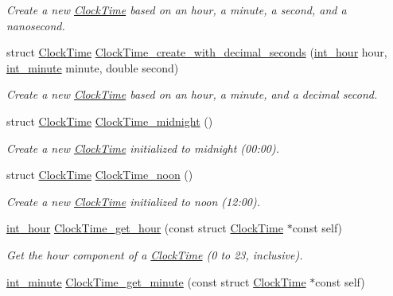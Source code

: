 \begin{DoxyCompactItemize}
\begin{DoxyCompactList}\small\item\em \-Create a new \hyperlink{structClockTime}{\-Clock\-Time} based on an hour, a minute, a second, and a nanosecond. \end{DoxyCompactList}\item 
struct \hyperlink{structClockTime}{\-Clock\-Time} \hyperlink{clock-time_8h_a519b7c6074cf1addc815f7495048c30b}{\-Clock\-Time\-\_\-create\-\_\-with\-\_\-decimal\-\_\-seconds} (\hyperlink{types_8h_afc81a27a9c08f0790f17b34bdf95cdb7}{int\-\_\-hour} hour, \hyperlink{types_8h_ae648329a919e6d860ef5ef2aac4ffb86}{int\-\_\-minute} minute, double second)
\begin{DoxyCompactList}\small\item\em \-Create a new \hyperlink{structClockTime}{\-Clock\-Time} based on an hour, a minute, and a decimal second. \end{DoxyCompactList}\item 
struct \hyperlink{structClockTime}{\-Clock\-Time} \hyperlink{clock-time_8h_ae320c2e30dedf0b33d5306b9e8841261}{\-Clock\-Time\-\_\-midnight} ()
\begin{DoxyCompactList}\small\item\em \-Create a new \hyperlink{structClockTime}{\-Clock\-Time} initialized to midnight (00\-:00). \end{DoxyCompactList}\item 
struct \hyperlink{structClockTime}{\-Clock\-Time} \hyperlink{clock-time_8h_a183049a7386a7b7377ba3059d15485c4}{\-Clock\-Time\-\_\-noon} ()
\begin{DoxyCompactList}\small\item\em \-Create a new \hyperlink{structClockTime}{\-Clock\-Time} initialized to noon (12\-:00). \end{DoxyCompactList}\item 
\hyperlink{types_8h_afc81a27a9c08f0790f17b34bdf95cdb7}{int\-\_\-hour} \hyperlink{clock-time_8h_a1688a98fb161dc7a743085b09cb3c1de}{\-Clock\-Time\-\_\-get\-\_\-hour} (const struct \hyperlink{structClockTime}{\-Clock\-Time} $\ast$const self)
\begin{DoxyCompactList}\small\item\em \-Get the hour component of a \hyperlink{structClockTime}{\-Clock\-Time} (0 to 23, inclusive). \end{DoxyCompactList}\item 
\hyperlink{types_8h_ae648329a919e6d860ef5ef2aac4ffb86}{int\-\_\-minute} \hyperlink{clock-time_8h_a3ea78f71041658c2f9530c3603b7b9ec}{\-Clock\-Time\-\_\-get\-\_\-minute} (const struct \hyperlink{structClockTime}{\-Clock\-Time} $\ast$const self)

\end{DoxyCompactItemize}
